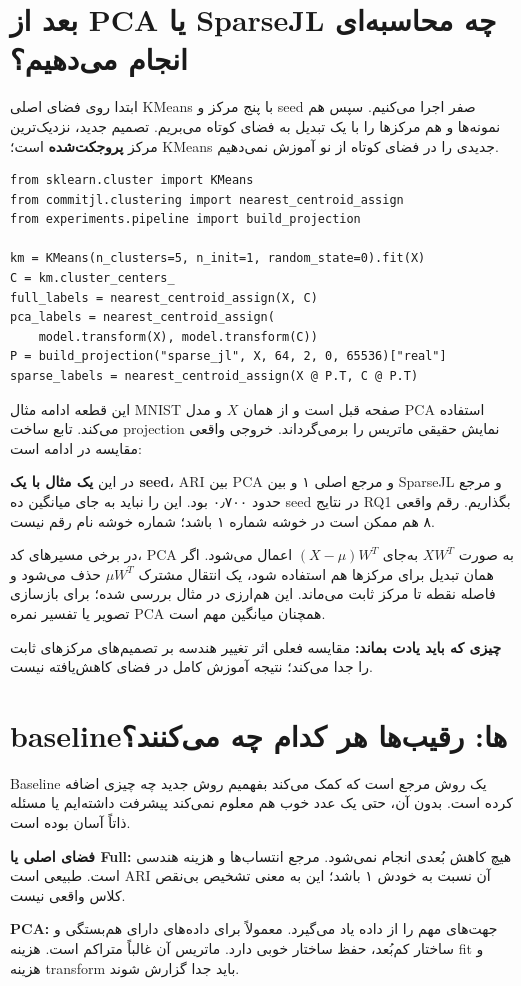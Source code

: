 \documentclass[11pt,a4paper]{article}
\newcommand{\lesson}[1]{\clearpage\section{#1}}
\newcommand{\codefile}[1]{\begin{latin}\end{latin}}
\newcommand{\takeaway}[1]{\par\textbf{چیزی که باید یادت بماند:} #1\par}
\begin{document}
\lesson{بعد از PCA یا SparseJL چه محاسبه‌ای انجام می‌دهیم؟}
ابتدا روی فضای اصلی KMeans با پنج مرکز و seed صفر اجرا می‌کنیم. سپس هم نمونه‌ها و هم مرکزها را با یک تبدیل به فضای کوتاه می‌بریم. تصمیم جدید، نزدیک‌ترین مرکز \textbf{پروجکت‌شده} است؛ KMeans جدیدی را در فضای کوتاه از نو آموزش نمی‌دهیم.
\begin{latin}\begin{lstlisting}
from sklearn.cluster import KMeans
from commitjl.clustering import nearest_centroid_assign
from experiments.pipeline import build_projection

km = KMeans(n_clusters=5, n_init=1, random_state=0).fit(X)
C = km.cluster_centers_
full_labels = nearest_centroid_assign(X, C)
pca_labels = nearest_centroid_assign(
    model.transform(X), model.transform(C))
P = build_projection("sparse_jl", X, 64, 2, 0, 65536)["real"]
sparse_labels = nearest_centroid_assign(X @ P.T, C @ P.T)
\end{lstlisting}\end{latin}
این قطعه ادامه مثال MNIST صفحه قبل است و از همان \(X\) و مدل PCA استفاده می‌کند. تابع ساخت projection نمایش حقیقی ماتریس را برمی‌گرداند. خروجی واقعی مقایسه در ادامه است:
\codefile{assignments_output.txt}
در این \textbf{یک مثال با یک seed}، ARI بین PCA و مرجع اصلی ۱ و بین SparseJL و مرجع حدود ۰٫۷۰۰ بود. این را نباید به جای میانگین ده seed در نتایج RQ1 بگذاریم. رقم واقعی ۸ هم ممکن است در خوشه شماره ۱ باشد؛ شماره خوشه نام رقم نیست.

در برخی مسیرهای کد، PCA به صورت \(XW^T\) به‌جای \((X-\mu)W^T\) اعمال می‌شود. اگر همان تبدیل برای مرکزها هم استفاده شود، یک انتقال مشترک \(\mu W^T\) حذف می‌شود و فاصله نقطه تا مرکز ثابت می‌ماند. این هم‌ارزی در مثال بررسی شده؛ برای بازسازی تصویر یا تفسیر نمره PCA همچنان میانگین مهم است.

\takeaway{مقایسه فعلی اثر تغییر هندسه بر تصمیم‌های مرکزهای ثابت را جدا می‌کند؛ نتیجه آموزش کامل در فضای کاهش‌یافته نیست.}

\lesson{baselineها: رقیب‌ها هر کدام چه می‌کنند؟}
Baseline یک روش مرجع است که کمک می‌کند بفهمیم روش جدید چه چیزی اضافه کرده است. بدون آن، حتی یک عدد خوب هم معلوم نمی‌کند پیشرفت داشته‌ایم یا مسئله ذاتاً آسان بوده است.

\textbf{فضای اصلی یا Full:} هیچ کاهش بُعدی انجام نمی‌شود. مرجع انتساب‌ها و هزینه هندسی است. طبیعی است ARI آن نسبت به خودش ۱ باشد؛ این به معنی تشخیص بی‌نقص کلاس واقعی نیست.

\textbf{PCA:} جهت‌های مهم را از داده یاد می‌گیرد. معمولاً برای داده‌های دارای هم‌بستگی و ساختار کم‌بُعد، حفظ ساختار خوبی دارد. ماتریس آن غالباً متراکم است. هزینه fit و هزینه transform باید جدا گزارش شوند.
\end{document}
